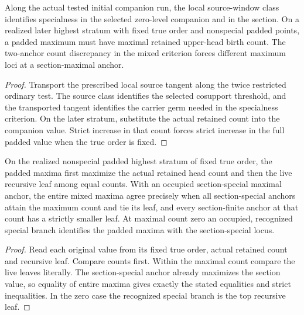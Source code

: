 \begin{theorem}
\label{hir:g1-mixed-tested-one-chart-special}
\leanok
Along the actual tested initial companion run, the local
source-window class identifies specialness in the selected
zero-level companion and in the section. On a realized later
highest stratum with fixed true order and nonspecial padded
points, a padded maximum must have maximal retained upper-head
birth count. The two-anchor count discrepancy in the mixed
criterion forces different maximum loci at a section-maximal
anchor.
\end{theorem}
\begin{proof}
Transport the prescribed local source tangent along the twice
restricted ordinary test. The source class identifies the
selected cosupport threshold, and the transported tangent
identifies the carrier germ needed in the specialness criterion.
On the later stratum, substitute the actual retained count into
the companion value. Strict increase in that count forces strict
increase in the full padded value when the true order is fixed.
\end{proof}

\begin{theorem}
\label{hir:g1-later-mixed-live-centres}
\leanok
On the realized nonspecial padded highest stratum of fixed
true order, the padded maxima first maximize the actual
retained head count and then the live recursive leaf among
equal counts. With an occupied section-special maximal anchor,
the entire mixed maxima agree precisely when all section-special
anchors attain the maximum count and tie its leaf, and every
section-finite anchor at that count has a strictly smaller leaf.
At maximal count zero an occupied, recognized special branch
identifies the padded maxima with the section-special locus.
\end{theorem}
\begin{proof}
Read each original value from its fixed true order, actual
retained count and recursive leaf. Compare counts first.
Within the maximal count compare the live leaves literally.
The section-special anchor already maximizes the section value,
so equality of entire maxima gives exactly the stated equalities
and strict inequalities. In the zero case the recognized special
branch is the top recursive leaf.
\end{proof}

